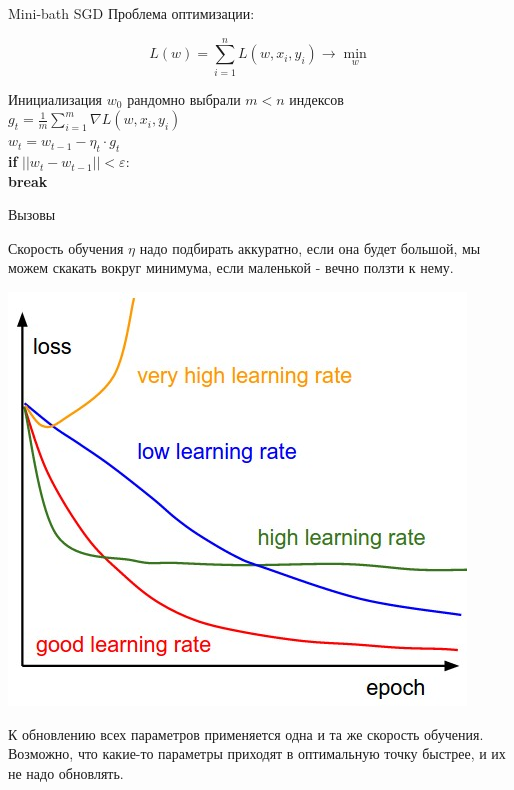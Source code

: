 \documentclass[notes,12pt, aspectratio=169]{beamer}
\newcommand{\pgr}[1]{{\color{green} \textbf{#1}}}
\newenvironment{wideitemize}{\itemize\addtolength{\itemsep}{10pt}}{\enditemize}
\begin{document}
\begin{frame}[fragile]{Mini-bath SGD}
Проблема оптимизации: 

\[   
L(w) = \sum_{i=1}^n L(w, x_i, y_i) \to \min_{w}
\]

Инициализация $w_0$ 
\pgr{\hspace{15pt}} рандомно выбрали $m < n$ индексов \\
\pgr{\hspace{15pt}} $g_t =\frac{1}{m}\sum_{i=1}^m  \nabla L(w, x_i, y_i)$ \\
\pgr{\hspace{15pt}} $w_t = w _{t-1} - \eta_t \cdot g_t   $ \\
\pgr{\hspace{15pt} if} $||w_t - w_{t-1}|| < \varepsilon:$ \\
\pgr{\hspace{30pt} break}
\end{frame}


\begin{frame}[fragile]{Вызовы}
\begin{wideitemize}
	\item Скорость обучения $\eta$ надо подбирать аккуратно, если она будет большой, мы можем скакать вокруг минимума, если маленькой - вечно ползти к нему.
	
	\begin{center}
		\includegraphics[width=0.25\paperwidth]{learningrates.jpg}
	\end{center}
	
	\item К обновлению всех параметров применяется одна и та же скорость обучения. Возможно, что какие-то параметры приходят в оптимальную точку быстрее, и их не надо обновлять.
\end{wideitemize}
\end{frame}
\end{document}
